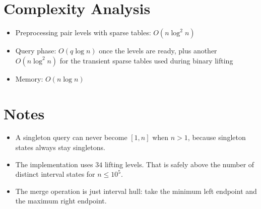 \section{Complexity Analysis}
\begin{itemize}
\item Preprocessing pair levels with sparse tables: \(O(n \log^2 n)\)
\item Query phase: \(O(q \log n)\) once the levels are ready, plus another \(O(n \log^2 n)\) for the transient sparse tables used during binary lifting
\item Memory: \(O(n \log n)\)
\end{itemize}

\section{Notes}
\begin{itemize}
\item A singleton query can never become \([1,n]\) when \(n > 1\), because singleton states always stay singletons.
\item The implementation uses \(34\) lifting levels. That is safely above the number of distinct interval states for \(n \le 10^5\).
\item The merge operation is just interval hull: take the minimum left endpoint and the maximum right endpoint.
\end{itemize}
